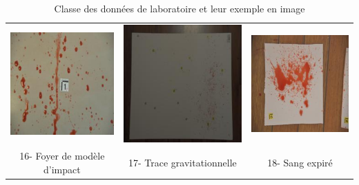 \documentclass[a4paper]{article}
\begin{document}
\begin{table}[ht]
\begin{tabular}{ccc}
        \includegraphics[width=0.15\linewidth]{../asset/data_labo/16_carrelage_598.jpg} & \includegraphics[width=0.15\linewidth]{../asset/data_labo/17_papier_8323.jpg} & \includegraphics[width=0.15\linewidth]{../asset/data_labo/18_bois_4727.jpg}\\
        16- Foyer de modèle d'impact & 17- Trace gravitationnelle & 18- Sang expiré \\
    \end{tabular}
    \caption{Classe des données de laboratoire et leur exemple en image}
    \label{tab: images of all classes}
\end{table}
\end{document}
